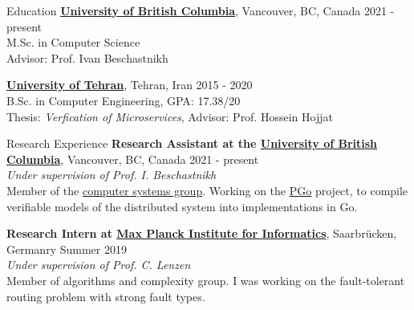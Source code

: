 \documentclass{resume} %
\begin{document}
	

\begin{rSection}{Education}
	{\bf \href{https://www.ubc.ca/}{University of British Columbia}}, Vancouver, BC, Canada \hfill 2021 - present
	\\M.Sc. in Computer Science
	\\Advisor: Prof. Ivan Beschastnikh
	
	{\bf \href{http://ut.ac.ir/en}{University of Tehran}}, Tehran, Iran \hfill 2015 - 2020 
	\\B.Sc. in Computer Engineering, GPA: 17.38/20 
    \\Thesis: \textit{Verfication of Microservices}, Advisor: Prof. Hossein Hojjat
\end{rSection}


\begin{rSection}{Research Experience}
	{\bf Research Assistant at the \href{https://www.ubc.ca/}{University of British Columbia}}, {Vancouver, BC, Canada \hfill 2021 - present}
	\\ \textit{Under supervision of Prof. I. Beschastnikh} \smallskip
	\\Member of the \href{https://systopia.cs.ubc.ca/}{computer systems group}. Working on the \href{https://github.com/UBC-NSS/pgo}{PGo} project, to compile verifiable models of the distributed system into implementations in Go.

	{\bf Research Intern at \href{https://www.mpi-inf.mpg.de/}{Max Planck Institute for Informatics}}, {Saarbr{\"u}cken, Germanry \hfill Summer 2019}
	\\ \textit{Under supervision of Prof. C. Lenzen} \smallskip
	\\Member of algorithms and complexity group. I was working on the fault-tolerant routing problem with strong fault types.

\end{rSection}

\end{document}
